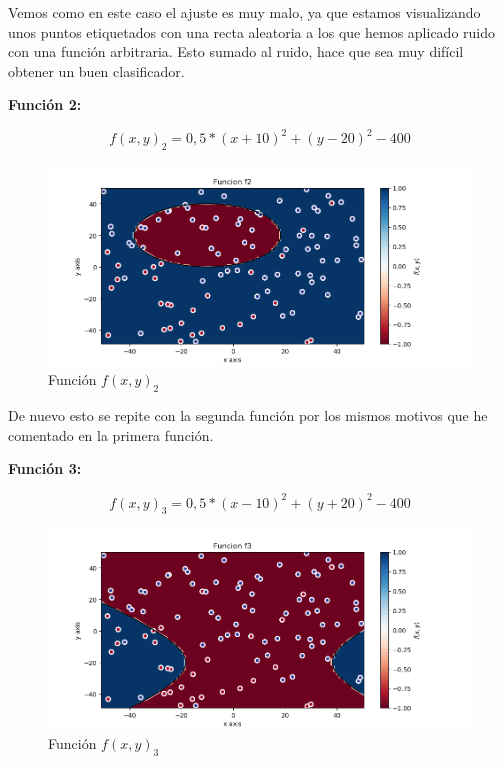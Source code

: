\documentclass[12pt, spanish]{article}
\begin{document}
Vemos como en este caso el ajuste es muy malo, ya que estamos visualizando unos puntos etiquetados con una recta aleatoria a los que hemos aplicado ruido con una función arbitraria. Esto sumado al ruido, hace que sea muy difícil obtener un buen clasificador.

\textbf{Función 2:} 

$$ f(x, y)_2 = 0,5*(x + 10)^2 + (y - 20)^2 - 400  $$

\begin{figure}[H]
  \centering
      \includegraphics[scale = 0.70]{ej1-3-f2.png}
 		 \caption{Función $f(x, y)_2$}
  		\label{fig:ej1-f2}

\end{figure}

De nuevo esto se repite con la segunda función por los mismos motivos que he comentado en la primera función.


\textbf{Función 3:} 

$$ f(x, y)_3 = 0,5*(x - 10)^2 + (y + 20)^2 - 400 $$

\begin{figure}[H]
  \centering
      \includegraphics[scale = 0.70]{ej1-3-f3.png}
 		 \caption{Función $f(x, y)_3$}
  		\label{fig:ej1-f3}

\end{figure}
\end{document}
